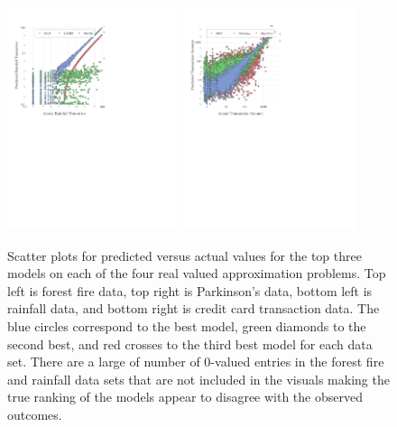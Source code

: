 \documentclass[singlespace,nopageskip]{VTthesis} %
\begin{document}
\begin{appendices}
\begin{figure}[h]
  \includegraphics[width=0.45\textwidth,]{Figures/NA/scatter_weather.pdf}
  \hspace{.6cm}
  \includegraphics[width=0.45\textwidth,]{Figures/NA/scatter_creditcard.pdf}
  \vspace{.3cm}

  \caption{Scatter plots for predicted versus actual values for the
    top three models on each of the four real valued approximation
    problems. Top left is forest fire data, top right is Parkinson's
    data, bottom left is rainfall data, and bottom right is credit
    card transaction data. The blue circles correspond to the best
    model, green diamonds to the second best, and red crosses to the
    third best model for each data set. There are a large of number of
    0-valued entries in the forest fire and rainfall data sets that
    are not included in the visuals making the true ranking of the
    models appear to disagree with the observed outcomes.}
  \label{fig:scatter_plots}
\end{figure}



\end{appendices}
\end{document}
